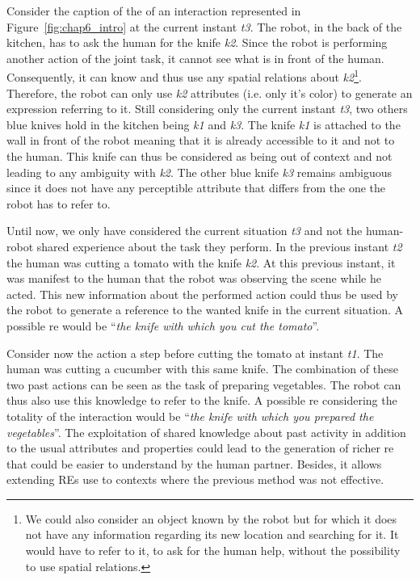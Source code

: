 Consider the caption of the of an interaction represented in Figure~\ref{fig:chap6_intro} at the current instant \textit{t3}. The robot, in the back of the kitchen, has to ask the human for the knife \textit{k2}. Since the robot is performing another action of the joint task, it cannot see what is in front of the human. Consequently, it can know and thus use any spatial relations about \textit{k2}\footnote{We could also consider an object known by the robot but for which it does not have any information regarding its new location and searching for it. It would have to refer to it, to ask for the human help, without the possibility to use spatial relations.}. Therefore, the robot can only use \textit{k2} attributes (i.e. only it's color) to generate an expression referring to it. Still considering only the current instant \textit{t3}, two others blue knives hold in the kitchen being \textit{k1} and \textit{k3}. The knife \textit{k1} is attached to the wall in front of the robot meaning that it is already accessible to it and not to the human. This knife can thus be considered as being out of context and not leading to any ambiguity with \textit{k2}. The other blue knife \textit{k3} remains ambiguous since it does not have any perceptible attribute that differs from the one the robot has to refer to.

Until now, we only have considered the current situation \textit{t3} and not the human-robot shared experience about the task they perform. In the previous instant \textit{t2} the human was cutting a tomato with the knife \textit{k2}. At this previous instant, it was manifest to the human that the robot was observing the scene while he acted. This new information about the performed action could thus be used by the robot to generate a reference to the wanted knife in the current situation. A possible \acrshort{re} would be ``\textit{the knife with which you cut the tomato}''. 

Consider now the action a step before cutting the tomato at instant \textit{t1}. The human was cutting a cucumber with this same knife. The combination of these two past actions can be seen as the task of preparing vegetables. The robot can thus also use this knowledge to refer to the knife. A possible \acrshort{re} considering the totality of the interaction would be ``\textit{the knife with which you prepared the vegetables}''. The exploitation of shared knowledge about past activity in addition to the usual attributes and properties could lead to the generation of richer \acrshort{re} that could be easier to understand by the human partner. Besides, it allows extending REs use to contexts where the previous method was not effective.

